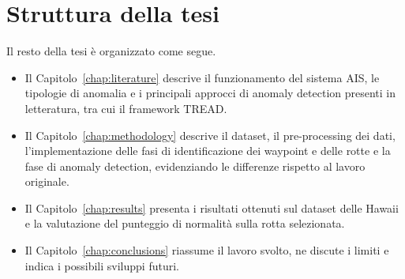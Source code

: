 \section{Struttura della tesi}\label{sec:intro_structure}

Il resto della tesi è organizzato come segue.
\begin{itemize}
    \item Il Capitolo~\ref{chap:literature} descrive il funzionamento del sistema AIS, le tipologie di anomalia
          e i principali approcci di anomaly detection presenti in letteratura, tra cui il framework TREAD.
    \item Il Capitolo~\ref{chap:methodology} descrive il dataset, il pre-processing dei dati, l'implementazione
          delle fasi di identificazione dei waypoint e delle rotte e la fase di anomaly detection, evidenziando
          le differenze rispetto al lavoro originale.
    \item Il Capitolo~\ref{chap:results} presenta i risultati ottenuti sul dataset delle Hawaii e la valutazione
          del punteggio di normalità sulla rotta selezionata.
    \item Il Capitolo~\ref{chap:conclusions} riassume il lavoro svolto, ne discute i limiti e indica i possibili
          sviluppi futuri.
\end{itemize}
